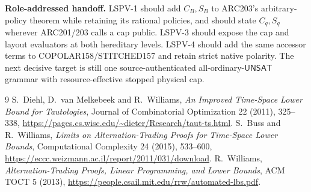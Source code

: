 \documentclass[11pt]{article}
\newcommand{\UNSAT}{\mathsf{UNSAT}}
\begin{document}
\textbf{Role-addressed handoff.}  LSPV-1 should add $C_B,S_B$ to ARC203's
arbitrary-policy theorem while retaining its rational policies, and should
state $C_q,S_q$ wherever ARC201/203 calls a cap public.  LSPV-3 should expose
the cap and layout evaluators at both hereditary levels.  LSPV-4 should add
the same accessor terms to COPOLAR158/STITCHED157 and retain strict native
polarity.  The next decisive target is still one source-authenticated
all-ordinary-$\UNSAT$ grammar with resource-effective stopped physical cap.

\begin{thebibliography}{9}
 S.~Diehl, D.~van Melkebeek and R.~Williams,
\emph{An Improved Time-Space Lower Bound for Tautologies}, Journal of
Combinatorial Optimization 22 (2011), 325--338,
\url{https://pages.cs.wisc.edu/~dieter/Research/taut-ts.html}.
 S.~Buss and R.~Williams,
\emph{Limits on Alternation-Trading Proofs for Time-Space Lower Bounds},
Computational Complexity 24 (2015), 533--600,
\url{https://eccc.weizmann.ac.il/report/2011/031/download}.
 R.~Williams,
\emph{Alternation-Trading Proofs, Linear Programming, and Lower Bounds},
ACM TOCT 5 (2013),
\url{https://people.csail.mit.edu/rrw/automated-lbs.pdf}.
\end{thebibliography}
\end{document}
